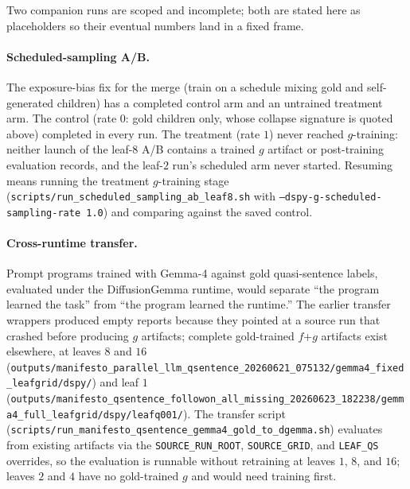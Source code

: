 Two companion runs are scoped and incomplete; both are stated here as
placeholders so their eventual numbers land in a fixed frame.

\paragraph{Scheduled-sampling A/B.} The exposure-bias fix for the
merge (train on a schedule mixing gold and self-generated children)
has a completed control arm and an untrained treatment arm. The
control (rate $0$: gold children only, whose collapse signature is
quoted above) completed in every run. The treatment (rate $1$) never
reached $g$-training: neither launch of the leaf-$8$ A/B contains a
trained $g$ artifact or post-training evaluation records, and the
leaf-$2$ run's scheduled arm never started. Resuming means running
the treatment $g$-training stage
(\texttt{scripts/run\_scheduled\_sampling\_ab\_leaf8.sh} with
\texttt{--dspy-g-scheduled-sampling-rate 1.0}) and comparing against
the saved control. 

\paragraph{Cross-runtime transfer.} Prompt programs trained with
Gemma-4 against gold quasi-sentence labels, evaluated under the
DiffusionGemma runtime, would separate ``the program learned the
task'' from ``the program learned the runtime.'' The earlier transfer
wrappers produced empty reports because they pointed at a source run
that crashed before producing $g$ artifacts; complete gold-trained
$f$+$g$ artifacts exist elsewhere, at leaves $8$ and $16$
(\texttt{outputs/manifesto\_parallel\_llm\_qsentence\_20260621\_075132/gemma4\_fixed\_leafgrid/dspy/})
and leaf $1$
(\texttt{outputs/manifesto\_qsentence\_followon\_all\_missing\_20260623\_182238/gemma4\_full\_leafgrid/dspy/leafq001/}).
The transfer script
(\texttt{scripts/run\_manifesto\_qsentence\_gemma4\_gold\_to\_dgemma.sh})
evaluates from existing artifacts via the \texttt{SOURCE\_RUN\_ROOT},
\texttt{SOURCE\_GRID}, and \texttt{LEAF\_QS} overrides, so the
evaluation is runnable without retraining at leaves $1$, $8$, and
$16$; leaves $2$ and $4$ have no gold-trained $g$ and would need
training first. 
